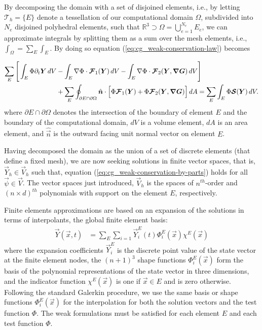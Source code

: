 \documentclass{report}
\numberwithin{equation}{section}
\begin{document}
By decomposing the domain with a set of disjoined elements, i.e., by letting $\mathcal{T}_h = \lbrace E \rbrace$ denote a tessellation of our computational domain $\Omega$, subdivided into $N_e$ disjoined polyhedral elements, such that $\mathbb{R}^3\supset\Omega = \bigcup_{e=1}^{N_e}E_e$, we can approximate integrals by splitting them as a sum over the mesh elements, i.e., $\int_\Omega = \sum_{E} \int_{E}$. By doing so equation (\ref{eq:cg_weak-conservation-law}) becomes

\begin{align}\label{eq:cg_weak-conservation-by-parts}
    \sum_{E} \Bigg[ \int_E \Phi \partial_t \boldsymbol{{Y}} \, dV 
    & - \int_E \nabla \Phi \cdot \boldsymbol{{\mathcal{F}}}_1(\boldsymbol{{Y}}) \, dV  \nonumber 
     - \int_E \nabla \Phi \cdot \boldsymbol{{\mathcal{F}}}_2(\boldsymbol{{Y}}, \boldsymbol{{\nabla}} \boldsymbol{{G}}) \, dV \Bigg]\\
    & + \sum_{E}\oint_{\partial E \cap \partial \Omega} \hat {\boldsymbol{{n}}} \cdot \Big[\Phi \boldsymbol{{\mathcal{F}}}_1(\boldsymbol{{Y}}) + \Phi \boldsymbol{{\mathcal{F}}}_2(\boldsymbol{{Y}}, \boldsymbol{{\nabla}} \boldsymbol{{G}}) \Big] \, dA
    = \sum_{E} \int_E \Phi \boldsymbol{{\mathcal{S}}}(\boldsymbol{{Y}}) \, dV. 
\end{align}
where $\partial E\cap \partial \Omega$ denotes the intersection of the boundary of element $E$ and the boundary of the computational domain, $dV$ is a volume element, $dA$ is an area element, and $\hat{\vec n }$ is the outward facing unit normal vector on element $E$. 

Having decomposed the domain as the union of a set of discrete elements (that define a fixed mesh), we are now seeking solutions in finite vector spaces, that is, $\vec{Y}_h \in \vec{V}_h$ such that, equation (\ref{eq:cg_weak-conservation-by-parts}) holds for all $\vec{\psi} \in \vec{V}$. The vector spaces just introduced, $\vec{V}_h$ is the spaces of $n^{th}$-order and $(n\times d)^{th}$ polynomials with support on the element $E$, respectively. 

Finite elements approximations are based on an expansion of the solutions in terms of interpolants, the global finite element basis:
\begin{align}
    \vec Y(\vec x, t) & = \sum_E \sum_{i=1} \vec Y_i^E(t) \Phi_i^E(\vec x) \chi^E(\vec x)
\end{align}
where the expansion coefficients $\vec Y_i^E$ is the discrete point value of the state vector at the finite element nodes, the $(n+1)^3$ shape functions $\Phi_i^E(\vec x)$ form the basis of the polynomial representations of the state vector in three dimensions, and the indicator function $\chi^E(\vec x)$ is one if $\vec x \in E$ and is zero otherwise. Following the standard Galerkin procedure, we use the same basis or shape functions $\Phi_i^E(\vec x)$ for the interpolation for both the solution vectors and the test function $\Phi$.
The weak formulations must be satisfied for each element $E$ and each test function $\Phi$. 
\end{document}
